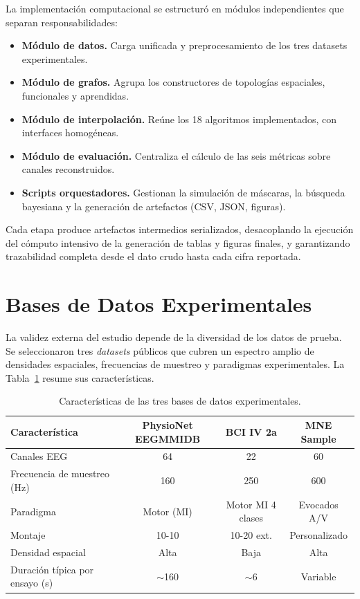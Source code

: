 La implementación computacional se estructuró en módulos independientes que separan responsabilidades:
\begin{itemize}
    \item \textbf{Módulo de datos.} Carga unificada y preprocesamiento de los tres datasets experimentales.
    \item \textbf{Módulo de grafos.} Agrupa los constructores de topologías espaciales, funcionales y aprendidas.
    \item \textbf{Módulo de interpolación.} Reúne los 18 algoritmos implementados, con interfaces homogéneas.
    \item \textbf{Módulo de evaluación.} Centraliza el cálculo de las seis métricas sobre canales reconstruidos.
    \item \textbf{Scripts orquestadores.} Gestionan la simulación de máscaras, la búsqueda bayesiana y la generación de artefactos (CSV, JSON, figuras).
\end{itemize}
Cada etapa produce artefactos intermedios serializados, desacoplando la ejecución del cómputo intensivo de la generación de tablas y figuras finales, y garantizando trazabilidad completa desde el dato crudo hasta cada cifra reportada.

\section{Bases de Datos Experimentales}

La validez externa del estudio depende de la diversidad de los datos de prueba. Se seleccionaron tres \textit{datasets} públicos que cubren un espectro amplio de densidades espaciales, frecuencias de muestreo y paradigmas experimentales. La Tabla~\ref{tab:datasets} resume sus características.

\begin{table}[ht]
\centering
\caption{Características de las tres bases de datos experimentales.}
\label{tab:datasets}
\begin{tabular}{lccc}
\toprule
\textbf{Característica} & \textbf{PhysioNet EEGMMIDB} & \textbf{BCI IV 2a} & \textbf{MNE Sample} \\
\midrule
Canales EEG                         & 64         & 22          & 60 \\
Frecuencia de muestreo (Hz)         & 160        & 250         & 600 \\
Paradigma                           & Motor (MI) & Motor MI 4 clases & Evocados A/V \\
Montaje                             & 10-10      & 10-20 ext.  & Personalizado \\
Densidad espacial                   & Alta       & Baja        & Alta \\
Duración típica por ensayo (s)      & $\sim$160  & $\sim$6     & Variable \\
\bottomrule
\end{tabular}
\end{table}

